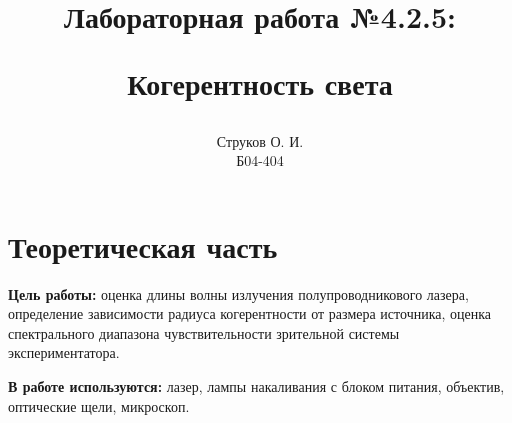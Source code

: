 \documentclass[a4paper,12pt]{extarticle}
\begin{document}

\title{\begin{center}Лабораторная работа №4.2.5:\end{center}
Когерентность света}
\author{Струков О. И. \\ Б04-404}
\date{}

\thispagestyle{empty}
\maketitle
\newpage
{}


\section*{Теоретическая часть}



\qquad\textbf{Цель работы:} оценка длины волны излучения полупроводникового лазера, определение зависимости радиуса когерентности от размера источника, оценка спектрального диапазона чувствительности зрительной системы экспериментатора.

\textbf{В работе используются:} лазер, лампы накаливания с блоком питания, объектив, оптические щели, микроскоп.
\end{document}
